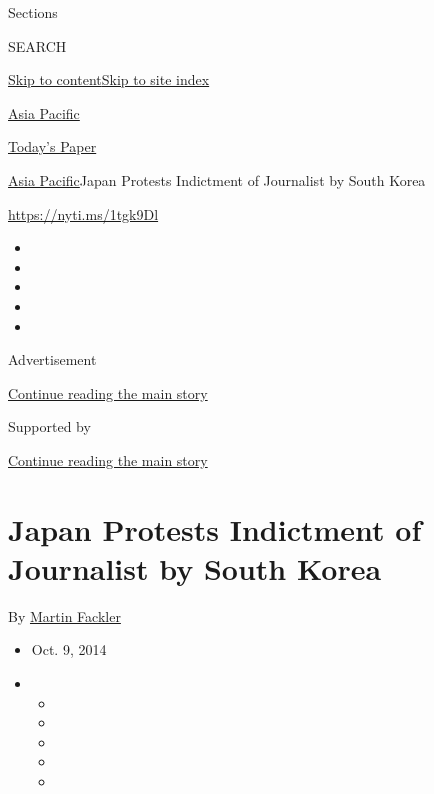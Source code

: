 Sections

SEARCH

\protect\hyperlink{site-content}{Skip to
content}\protect\hyperlink{site-index}{Skip to site index}

\href{https://www.nytimes3xbfgragh.onion/section/world/asia}{Asia
Pacific}

\href{https://myaccount.nytimes3xbfgragh.onion/auth/login?response_type=cookie\&client_id=vi}{}

\href{https://www.nytimes3xbfgragh.onion/section/todayspaper}{Today's
Paper}

\href{/section/world/asia}{Asia Pacific}\textbar{}Japan Protests
Indictment of Journalist by South Korea

\url{https://nyti.ms/1tgk9Dl}

\begin{itemize}
\item
\item
\item
\item
\item
\end{itemize}

Advertisement

\protect\hyperlink{after-top}{Continue reading the main story}

Supported by

\protect\hyperlink{after-sponsor}{Continue reading the main story}

\hypertarget{japan-protests-indictment-of-journalist-by-south-korea}{%
\section{Japan Protests Indictment of Journalist by South
Korea}\label{japan-protests-indictment-of-journalist-by-south-korea}}

By \href{http://www.nytimes3xbfgragh.onion/by/martin-fackler}{Martin
Fackler}

\begin{itemize}
\item
  Oct. 9, 2014
\item
  \begin{itemize}
  \item
  \item
  \item
  \item
  \item
  \end{itemize}
\end{itemize}

